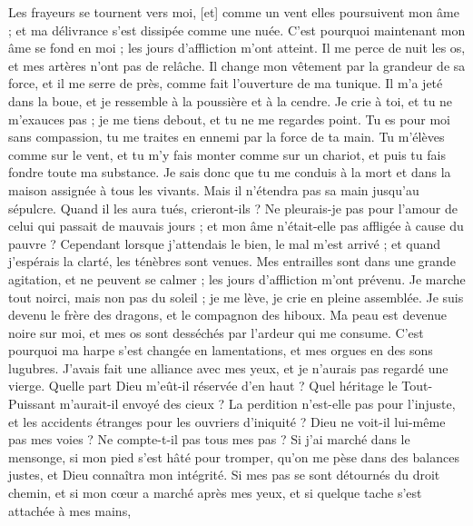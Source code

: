 \begin{multicols}{2}
Les frayeurs se tournent vers moi, [et] comme un vent elles poursuivent mon âme ; et ma délivrance s'est dissipée comme une nuée.
C'est pourquoi maintenant mon âme se fond en moi ; les jours d'affliction m'ont atteint. 
Il me perce de nuit les os, et mes artères n'ont pas de relâche. 
Il change mon vêtement par la grandeur de sa force, et il me serre de près, comme fait l'ouverture de ma tunique.
Il m'a jeté dans la boue, et je ressemble à la poussière et à la cendre. 
Je crie à toi, et tu ne m'exauces pas ; je me tiens debout, et tu ne me regardes point. 
Tu es pour moi sans compassion, tu me traites en ennemi par la force de ta main. 
Tu m'élèves comme sur le vent, et tu m'y fais monter comme sur un chariot, et puis tu fais fondre toute ma substance. 
Je sais donc que tu me conduis à la mort et dans la maison assignée à tous les vivants.
Mais il n'étendra pas sa main jusqu'au sépulcre. Quand il les aura tués, crieront-ils ? 
Ne pleurais-je pas pour l'amour de celui qui passait de mauvais jours ; et mon âme n'était-elle pas affligée à cause du pauvre ?
Cependant lorsque j'attendais le bien, le mal m'est arrivé ; et quand j'espérais la clarté, les ténèbres sont venues. 
Mes entrailles sont dans une grande agitation, et ne peuvent se calmer ; les jours d'affliction m'ont prévenu. 
Je marche tout noirci, mais non pas du soleil ; je me lève, je crie en pleine assemblée. 
Je suis devenu le frère des dragons, et le compagnon des hiboux.
Ma peau est devenue noire sur moi, et mes os sont desséchés par l'ardeur qui me consume.
C'est pourquoi ma harpe s'est changée en lamentations, et mes orgues en des sons lugubres.
\VerseOne{}J'avais fait une alliance avec mes yeux, et je n'aurais pas regardé une vierge.
Quelle part Dieu m'eût-il réservée d'en haut ? Quel héritage le Tout-Puissant m'aurait-il envoyé des cieux ?
La perdition n'est-elle pas pour l'injuste, et les accidents étranges pour les ouvriers d'iniquité ?
Dieu ne voit-il lui-même pas mes voies ? Ne compte-t-il pas tous mes pas ?
Si j'ai marché dans le mensonge, si mon pied s'est hâté pour tromper,
qu'on me pèse dans des balances justes, et Dieu connaîtra mon intégrité.
Si mes pas se sont détournés du droit chemin, et si mon cœur a marché après mes yeux, et si quelque tache s'est attachée à mes mains,

\end{multicols}
